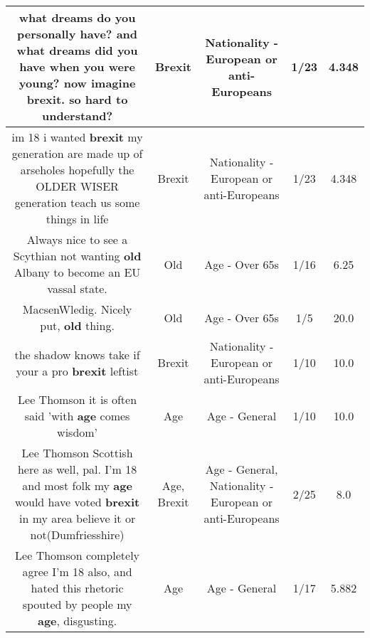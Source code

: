 \documentclass[11pt]{article}
\newlength\mylength
\begin{document}
\begin{center}
\begin{longtable}{|C{.65\mylength}|C{.30\mylength}|C{.12\mylength}|C{.12\mylength}|C{.12\mylength}|}
  \small what dreams do you personally have? and what dreams did you have when you were young? now imagine \textbf{brexit}. so hard to understand?\normalsize   & Brexit & Nationality - European or anti-Europeans & 1/23 & 4.348 \\  \hline
  \small im 18 i wanted \textbf{brexit} my generation are made up of arseholes hopefully the OLDER WISER generation teach us some things in life\normalsize   & Brexit & Nationality - European or anti-Europeans & 1/23 & 4.348 \\  \hline
  \small Always nice to see a Scythian not wanting \textbf{old} Albany to become an EU vassal state.\normalsize   & Old & Age - Over 65s & 1/16 & 6.25 \\  \hline
  \small MacsenWledig. Nicely put, \textbf{old} thing.\normalsize   & Old & Age - Over 65s & 1/5 & 20.0 \\  \hline
  \small the shadow knows take if your a pro \textbf{brexit} leftist\normalsize   & Brexit & Nationality - European or anti-Europeans & 1/10 & 10.0 \\  \hline
  \small Lee Thomson it is often said 'with \textbf{age} comes wisdom'\normalsize   & Age & Age - General & 1/10 & 10.0 \\  \hline
  \small Lee Thomson Scottish here as well, pal. I'm 18 and most folk my \textbf{age} would have voted \textbf{brexit} in my area believe it or not(Dumfriesshire)\normalsize   & Age, Brexit & Age - General, Nationality - European or anti-Europeans & 2/25 & 8.0 \\  \hline
  \small Lee Thomson completely agree I'm 18 also, and hated this rhetoric spouted by people my \textbf{age}, disgusting.\normalsize   & Age & Age - General & 1/17 & 5.882 \\  \hline

\end{longtable}
\end{center}
\end{document}
